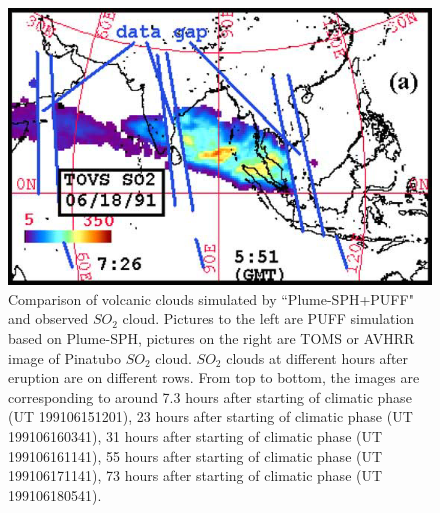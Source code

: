 \begin{figure}[!htb]
\begin{minipage}{.325\textwidth}
    \end{minipage}%
    \begin{minipage}{.325 \textwidth}
        \centering
        \includegraphics[width=0.99 \textwidth]{Chapter-7/Figures/OB-SO2-73hr-ash}
    \end{minipage}%
    \caption{Comparison of volcanic clouds simulated by ``Plume-SPH+PUFF" and observed $SO_2$ cloud. Pictures to the left are PUFF simulation based on Plume-SPH, pictures on the right are TOMS or AVHRR image of Pinatubo $SO_2$ cloud. $SO_2$ clouds at different hours after eruption are on different rows. From top to bottom, the images are corresponding to around 7.3 hours after starting of climatic phase (UT 199106151201), 23 hours after starting of climatic phase (UT 199106160341), 31 hours after starting of climatic phase (UT 199106161141), 55 hours after starting of climatic phase (UT 199106171141), 73 hours after starting of climatic phase (UT 199106180541).}
    \label{fig:Plume-SPH-Pinatubo-SO2-cloud}
\end{figure}

